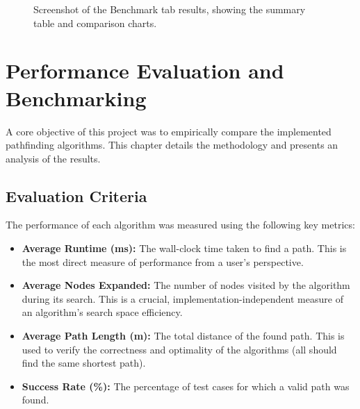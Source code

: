\documentclass[12pt, a4paper]{report}
\begin{document}
\begin{figure}[h!]
    \centering
    \fbox{\rule{0pt}{3in}\rule{0.9\linewidth}{0pt}}
    \caption{Screenshot of the Benchmark tab results, showing the summary table and comparison charts.}
    \label{fig:benchmark_ui}
\end{figure}

\clearpage
\chapter{Performance Evaluation and Benchmarking}

A core objective of this project was to empirically compare the implemented pathfinding algorithms. This chapter details the methodology and presents an analysis of the results.

\section{Evaluation Criteria}
The performance of each algorithm was measured using the following key metrics:
\begin{itemize}
    \item \textbf{Average Runtime (ms):} The wall-clock time taken to find a path. This is the most direct measure of performance from a user's perspective.
    \item \textbf{Average Nodes Expanded:} The number of nodes visited by the algorithm during its search. This is a crucial, implementation-independent measure of an algorithm's search space efficiency.
    \item \textbf{Average Path Length (m):} The total distance of the found path. This is used to verify the correctness and optimality of the algorithms (all should find the same shortest path).
    \item \textbf{Success Rate (\%):} The percentage of test cases for which a valid path was found.
\end{itemize}
\end{document}

